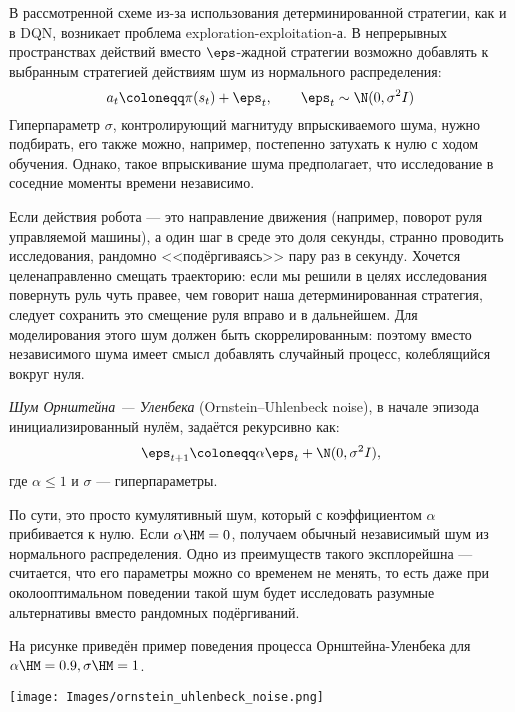 В рассмотренной схеме из-за использования детерминированной стратегии, как и в DQN, возникает проблема exploration-exploitation-а. В непрерывных пространствах действий вместо $\eps$-жадной стратегии возможно добавлять к выбранным стратегией действиям шум из нормального распределения:
$$a_t \coloneqq \pi(s_t) + \eps_t, \qquad \eps_t \sim \N(0, \sigma^2I)$$
Гиперпараметр $\sigma$, контролирующий магнитуду впрыскиваемого шума, нужно подбирать, его также можно, например, постепенно затухать к нулю с ходом обучения. Однако, такое впрыскивание шума предполагает, что исследование в соседние моменты времени независимо.

\begin{example}
Если действия робота --- это направление движения (например, поворот руля управляемой машины), а один шаг в среде это доля секунды, странно проводить исследования, рандомно <<подёргиваясь>> пару раз в секунду. Хочется целенаправленно смещать траекторию: если мы решили в целях исследования повернуть руль чуть правее, чем говорит наша детерминированная стратегия, следует сохранить это смещение руля вправо и в дальнейшем. Для моделирования этого шум должен быть скоррелированным: поэтому вместо независимого шума имеет смысл добавлять случайный процесс, колеблящийся вокруг нуля.
\end{example}

\begin{definition}
\emph{Шум Орнштейна — Уленбека} (Ornstein–Uhlenbeck noise), в начале эпизода инициализированный нулём, задаётся рекурсивно как:
$$\eps_{t + 1} \coloneqq \alpha \eps_t + \N(0, \sigma^2I),$$
где $\alpha \le 1$ и $\sigma$ --- гиперпараметры.
\end{definition}

По сути, это просто кумулятивный шум, который с коэффициентом $\alpha$ прибивается к нулю. Если $\alpha \HM= 0$, получаем обычный независимый шум из нормального распределения. Одно из преимуществ такого эксплорейшна --- считается, что его параметры можно со временем не менять, то есть даже при околооптимальном поведении такой шум будет исследовать разумные альтернативы вместо рандомных подёргиваний.

\begin{example}
На рисунке приведён пример поведения процесса Орнштейна-Уленбека для $\alpha \HM= 0.9, \sigma \HM= 1$.
\begin{center}
    \texttt{[image: Images/ornstein\_uhlenbeck\_noise.png]}
\end{center}
\end{example}

